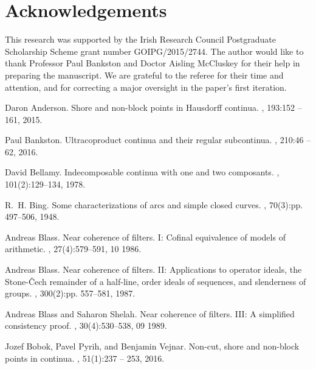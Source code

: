 \documentclass[12pt]{article}
\theoremstyle{plain}
\theoremstyle{definition}
\newcommand{\0}{\ensuremath{\varnothing}}
\begin{document}
	\section*{Acknowledgements}
	This research was supported by the Irish Research Council Postgraduate Scholarship Scheme grant number GOIPG/2015/2744. The author would like to thank Professor Paul Bankston and Doctor Aisling McCluskey for their help in preparing the manuscript. We are grateful to the referee for their time and attention, and for correcting a major oversight in the paper's first iteration.
	\begin{thebibliography}{10}
		
		Daron Anderson.
		\newblock Shore and non-block points in {H}ausdorff continua.
		, 193:152 -- 161, 2015.
		
		Paul Bankston.
		\newblock Ultracoproduct continua and their regular subcontinua.
		, 210:46 -- 62, 2016.
		
		David Bellamy.
		\newblock Indecomposable continua with one and two composants.
		, 101(2):129--134, 1978.
		
		R.~H. Bing.
		\newblock Some characterizations of arcs and simple closed curves.
		, 70(3):pp. 497--506, 1948.
		
		Andreas Blass.
		\newblock Near coherence of filters. {I}: Cofinal equivalence of models of
		arithmetic.
		, 27(4):579--591, 10 1986.
		
		Andreas Blass.
		\newblock Near coherence of filters. {II}: Applications to operator ideals, the
		{S}tone-\v{C}ech remainder of a half-line, order ideals of sequences, and
		slenderness of groups.
		, 300(2):pp.
		557--581, 1987.
		
		Andreas Blass and Saharon Shelah.
		\newblock Near coherence of filters. {III}: {A} simplified consistency proof.
		, 30(4):530--538, 09 1989.
		
		Jozef Bobok, Pavel Pyrih, and Benjamin Vejnar.
		\newblock Non-cut, shore and non-block points in continua.
		, 51(1):237 -- 253, 2016.
		

\end{thebibliography}
\end{document}
